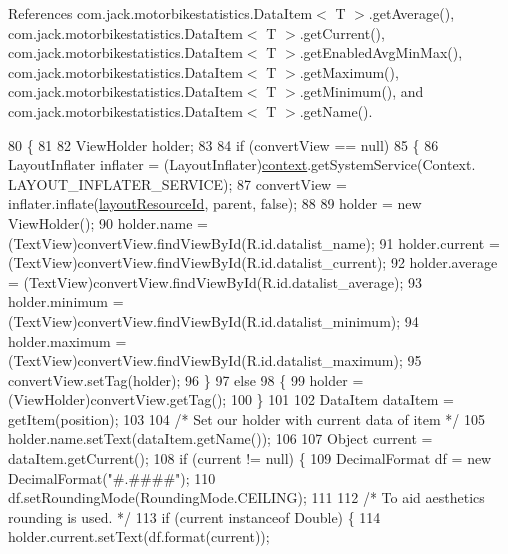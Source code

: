 References com.\+jack.\+motorbikestatistics.\+Data\+Item$<$ T $>$.\+get\+Average(), com.\+jack.\+motorbikestatistics.\+Data\+Item$<$ T $>$.\+get\+Current(), com.\+jack.\+motorbikestatistics.\+Data\+Item$<$ T $>$.\+get\+Enabled\+Avg\+Min\+Max(), com.\+jack.\+motorbikestatistics.\+Data\+Item$<$ T $>$.\+get\+Maximum(), com.\+jack.\+motorbikestatistics.\+Data\+Item$<$ T $>$.\+get\+Minimum(), and com.\+jack.\+motorbikestatistics.\+Data\+Item$<$ T $>$.\+get\+Name().


\begin{DoxyCode}
80                                                                           \{
81 
82         ViewHolder holder;
83 
84         \textcolor{keywordflow}{if} (convertView == null)
85         \{
86             LayoutInflater inflater = (LayoutInflater)\hyperlink{classcom_1_1jack_1_1motorbikestatistics_1_1_data_list_adapter_a2d3041a39701b01f4075cdc8c0bf4463}{context}.getSystemService(Context.
      LAYOUT\_INFLATER\_SERVICE);
87             convertView = inflater.inflate(\hyperlink{classcom_1_1jack_1_1motorbikestatistics_1_1_data_list_adapter_a03f68396c0f1b8b03feed8d6e3cf115d}{layoutResourceId}, parent, \textcolor{keyword}{false});
88 
89             holder = \textcolor{keyword}{new} ViewHolder();
90             holder.name = (TextView)convertView.findViewById(R.id.datalist\_name);
91             holder.current = (TextView)convertView.findViewById(R.id.datalist\_current);
92             holder.average = (TextView)convertView.findViewById(R.id.datalist\_average);
93             holder.minimum = (TextView)convertView.findViewById(R.id.datalist\_minimum);
94             holder.maximum = (TextView)convertView.findViewById(R.id.datalist\_maximum);
95             convertView.setTag(holder);
96         \}
97         \textcolor{keywordflow}{else}
98         \{
99             holder = (ViewHolder)convertView.getTag();
100         \}
101 
102         DataItem dataItem = getItem(position);
103 
104         \textcolor{comment}{/* Set our holder with current data of item */}
105         holder.name.setText(dataItem.getName());
106 
107         Object current = dataItem.getCurrent();
108         \textcolor{keywordflow}{if} (current != null) \{
109             DecimalFormat df = \textcolor{keyword}{new} DecimalFormat(\textcolor{stringliteral}{"#.####"});
110             df.setRoundingMode(RoundingMode.CEILING);
111 
112             \textcolor{comment}{/* To aid aesthetics rounding is used. */}
113             \textcolor{keywordflow}{if} (current instanceof Double) \{
114                 holder.current.setText(df.format(current));

\end{DoxyCode}
